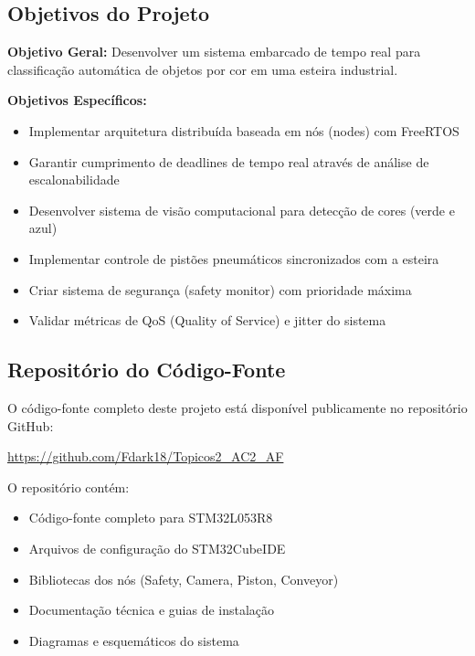 \documentclass[12pt,a4paper]{article}
\begin{document}
\subsection{Objetivos do Projeto}

\textbf{Objetivo Geral:} Desenvolver um sistema embarcado de tempo real para classificação automática de objetos por cor em uma esteira industrial.

\textbf{Objetivos Específicos:}

\begin{itemize}
    \item Implementar arquitetura distribuída baseada em nós (nodes) com FreeRTOS
    \item Garantir cumprimento de deadlines de tempo real através de análise de escalonabilidade
    \item Desenvolver sistema de visão computacional para detecção de cores (verde e azul)
    \item Implementar controle de pistões pneumáticos sincronizados com a esteira
    \item Criar sistema de segurança (safety monitor) com prioridade máxima
    \item Validar métricas de QoS (Quality of Service) e jitter do sistema
\end{itemize}

\subsection{Repositório do Código-Fonte}

O código-fonte completo deste projeto está disponível publicamente no repositório GitHub:

\begin{center}
\url{https://github.com/Fdark18/Topicos2_AC2_AF}
\end{center}

O repositório contém:
\begin{itemize}
    \item Código-fonte completo para STM32L053R8
    \item Arquivos de configuração do STM32CubeIDE
    \item Bibliotecas dos nós (Safety, Camera, Piston, Conveyor)
    \item Documentação técnica e guias de instalação
    \item Diagramas e esquemáticos do sistema
\end{itemize}

\end{document}
